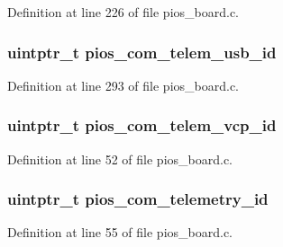 Definition at line 226 of file pios\-\_\-board.\-c.

\hypertarget{group___open_pilot_core_ga513cc36d72b76de2fcb75ff233a79a4a}{
\subsubsection[{pios\-\_\-com\-\_\-telem\-\_\-usb\-\_\-id}]{\setlength{\rightskip}{0pt plus 5cm}uintptr\-\_\-t pios\-\_\-com\-\_\-telem\-\_\-usb\-\_\-id}}\label{group___open_pilot_core_ga513cc36d72b76de2fcb75ff233a79a4a}


Definition at line 293 of file pios\-\_\-board.\-c.

\hypertarget{group___open_pilot_core_gaad17224bb36a5f3c73a716320de2b604}{
\subsubsection[{pios\-\_\-com\-\_\-telem\-\_\-vcp\-\_\-id}]{\setlength{\rightskip}{0pt plus 5cm}uintptr\-\_\-t pios\-\_\-com\-\_\-telem\-\_\-vcp\-\_\-id}}\label{group___open_pilot_core_gaad17224bb36a5f3c73a716320de2b604}


Definition at line 52 of file pios\-\_\-board.\-c.

\hypertarget{group___open_pilot_core_gac90e37dffee878bd2e1e9d2020b6a1de}{
\subsubsection[{pios\-\_\-com\-\_\-telemetry\-\_\-id}]{\setlength{\rightskip}{0pt plus 5cm}uintptr\-\_\-t pios\-\_\-com\-\_\-telemetry\-\_\-id}}\label{group___open_pilot_core_gac90e37dffee878bd2e1e9d2020b6a1de}


Definition at line 55 of file pios\-\_\-board.\-c.

